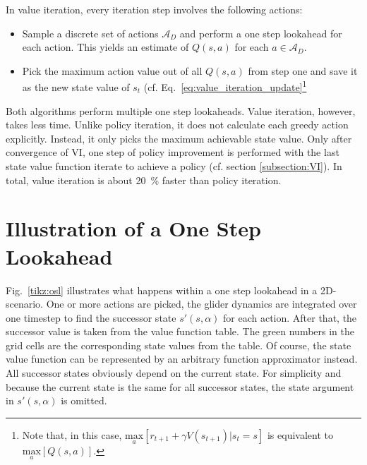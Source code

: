 In value iteration, every iteration step involves the following actions:

\begin{itemize}
	\item Sample a discrete set of actions $\mathcal{A}_D$ and perform a one step lookahead for each action. This yields an estimate of $Q(s,a)$ for each $a\in \mathcal{A}_D$.
	\item Pick the maximum action value out of all $Q(s,a)$ from step one and save it as the new state value of $s_t$ (cf. Eq.~\ref{eq:value_iteration_update}\footnote{Note that, in this case, $\underset{a}{\text{max}}[r_{t+1}+\gamma V(s_{t+1})|s_t=s]$ is equivalent to $\underset{a}{\text{max}}[Q(s,a)]$.}
\end{itemize}

Both algorithms perform multiple one step lookaheads. Value iteration, however, takes less time. Unlike policy iteration, it does not calculate each greedy action explicitly. Instead, it only picks the maximum achievable state value. Only after convergence of VI, one step of policy improvement is performed with the last state value function iterate to achieve a policy (cf. section \ref{subsection:VI}). In total, value iteration is about 20~\% faster than policy iteration. \newpage

\section{Illustration of a One Step Lookahead}

Fig.~\ref{tikz:osl} illustrates what happens within a one step lookahead in a 2D-scenario. One or more actions are picked, the glider dynamics are integrated over one timestep to find the successor state $s'(s,\alpha)$ for each action. After that, the successor value is taken from the value function table. The green numbers in the grid cells are the corresponding state values from the table. Of course, the state value function can be represented by an arbitrary function approximator instead. All successor states obviously depend on the current state. For simplicity and because the current state is the same for all successor states, the state argument in $s'(s,\alpha)$ is omitted.

